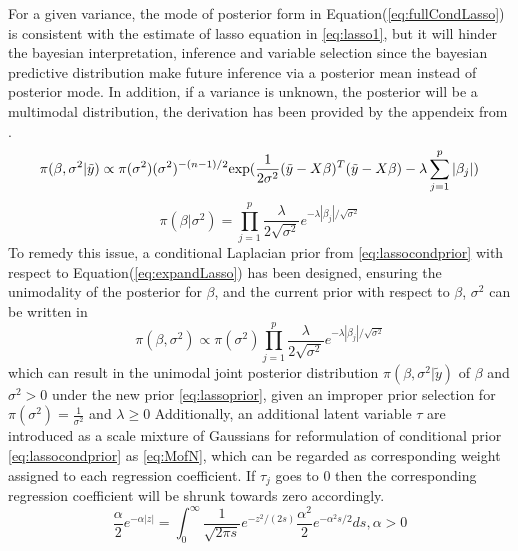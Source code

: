 For a given variance, the mode of  posterior form in Equation(\ref{eq:fullCondLasso}) is consistent with the estimate of lasso equation in \ref{eq:lasso1}, but it will hinder the bayesian interpretation, inference and variable selection since the bayesian predictive distribution make future inference via a posterior mean instead of posterior mode.
In addition, if a variance is unknown, the posterior will be a multimodal distribution, the derivation has been provided by the appendeix from \cite{park_casella_2008}.
\begin{equation}
	\label{eq:fullCondLasso}
	\pi(\beta,\sigma^2|\tilde{y}) \propto \pi(\sigma^2)(\sigma^2)^{-(n-1)/2}\textnormal{exp}(\frac{1}{2\sigma^2}(\tilde{y}-X\beta)^T(\tilde{y}-X\beta)-\lambda\sum_{j=1}^p|\beta_j|)
\end{equation}
\begin{equation}
	\label{eq:lassocondprior}
	\pi(\beta |\sigma^2) = \prod_{j=1}^p \frac{\lambda}{2\sqrt{\sigma^2}} e^{-\lambda|\beta_j|/\sqrt{\sigma^2}}
\end{equation}
To remedy this issue, a conditional Laplacian prior from \ref{eq:lassocondprior} with respect to Equation(\ref{eq:expandLasso}) has been designed, ensuring the unimodality of the posterior for $\beta$, and the current prior with respect to $\beta$, $\sigma^2$  can be written in 
\begin{equation}
	\label{eq:lassoprior}
	\pi(\beta,\sigma^2) \propto \pi(\sigma^2) \prod_{j=1}^p \frac{\lambda}{2\sqrt{\sigma^2}} e^{-\lambda|\beta_j|/\sqrt{\sigma^2}}
\end{equation}
which can result in the unimodal joint posterior distribution $\pi(\beta,\sigma^2|\tilde{y})$ of $\beta$ and $\sigma^2 > 0$ under the new prior \ref{eq:lassoprior}, given an improper prior selection for $\pi(\sigma^2) = \frac{1}{\sigma^2}$ and $\lambda \geq 0$
Additionally, an additional latent variable $\tau$ are introduced as a scale mixture of Gaussians for reformulation of conditional prior \ref{eq:lassocondprior} as \ref{eq:MofN}, which can be regarded as corresponding weight assigned to each regression coefficient. If $\tau_j$ goes to 0 then the corresponding regression coefficient will be shrunk towards zero accordingly.
\begin{equation}
	\label{eq:MofN}
	\frac{\alpha}{2}e^{-\alpha|z|} = \int_{0}^{\infty} \frac{1}{\sqrt{2\pi s}}e^{-z^2/(2s)} \frac{\alpha^2}{2}e^{-\alpha^2s/2}ds, \alpha > 0
\end{equation}

